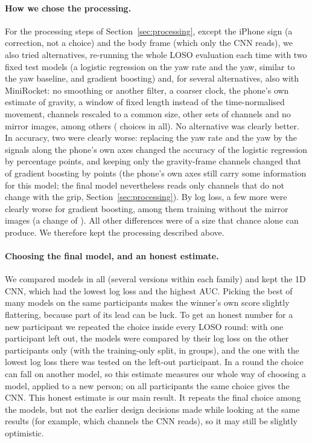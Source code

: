 \paragraph{How we chose the processing.} For the processing steps of Section~\ref{sec:processing}, except the iPhone
sign (a correction, not a choice) and the body frame (which only the CNN reads), we also tried alternatives, re-running
the whole LOSO evaluation each time with two fixed test models (a logistic regression on the yaw rate and the yaw,
similar to the yaw baseline, and gradient boosting) and, for several alternatives, also with MiniRocket: no smoothing
or another filter, a coarser clock, the phone's own estimate of gravity, a window of fixed length instead of the
time-normalised movement, channels rescaled to a common size, other sets of channels and no mirror images, among
others ( choices in all). No alternative was clearly better. In accuracy, two were clearly worse:
replacing the yaw rate and the yaw by the signals along the phone's own axes changed the accuracy of the logistic
regression by  percentage points, and keeping only the gravity-frame channels changed that
of gradient boosting by  points (the phone's own axes still carry some information for
this model; the final model nevertheless reads only channels that do not change with the grip,
Section~\ref{sec:processing}). By log loss, a few more were clearly worse for gradient boosting, among them training
without the mirror images (a change of ). All other differences were of a size that chance
alone can produce. We therefore kept the processing described above.

\paragraph{Choosing the final model, and an honest estimate.} We compared  models in all
(several versions within each family) and kept the 1D CNN, which had the lowest log loss and the highest AUC. Picking
the best of many models on the same participants makes the winner's own score slightly flattering, because part of its
lead can be luck. To get an honest number for a new participant we repeated the choice inside every LOSO round: with
one participant left out, the  models were compared by their log loss on the other
 participants only (with the training-only split, in  groups),
and the one with the lowest log loss there was tested on the left-out participant. In a round the choice can fall on
another model, so this estimate measures our whole way of choosing a model, applied to a new person; on all
 participants the same choice gives the CNN. This honest estimate is our main result. It repeats
the final choice among the models, but not the earlier design decisions made while looking at the same results (for
example, which channels the CNN reads), so it may still be slightly optimistic.
